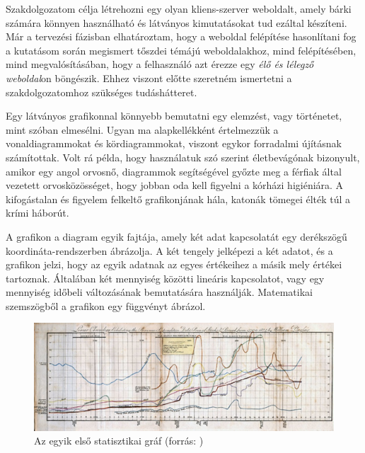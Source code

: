 
Szakdolgozatom célja létrehozni egy olyan kliens-szerver weboldalt, amely bárki számára könnyen használható és látványos kimutatásokat tud ezáltal készíteni. Már a tervezési fázisban elhatároztam, hogy a weboldal felépítése hasonlítani fog a kutatásom során megismert tőszdei témájú weboldalakhoz, mind felépítésében, mind megvalósításában, hogy a felhasználó azt érezze egy\textit{ élő és lélegző weboldal}on böngészik. Ehhez viszont előtte szeretném ismertetni a szakdolgozatomhoz szükséges tudáshátteret.


Egy látványos grafikonnal könnyebb bemutatni egy elemzést, vagy történetet, mint szóban elmesélni. Ugyan ma alapkellékként értelmezzük a vonaldiagrammokat és kördiagrammokat, viszont egykor forradalmi újításnak számítottak. Volt rá példa, hogy használatuk szó szerint életbevágónak bizonyult, amikor egy angol orvosnő, diagrammok segítségével győzte meg a férfiak által vezetett orvosközösséget, hogy jobban oda kell figyelni a kórházi higiéniára. A kifogástalan és figyelem felkeltő grafikonjának hála, katonák tömegei élték túl a krími háborút.  

	A grafikon a diagram egyik fajtája, amely két adat kapcsolatát egy derékszögű koordináta-rendszerben ábrázolja. A két tengely jelképezi a két adatot, és a grafikon jelzi, hogy az egyik adatnak az egyes értékeihez a másik mely értékei tartoznak. Általában két mennyiség közötti lineáris kapcsolatot, vagy egy mennyiség időbeli változásának bemutatására használják. Matematikai szemszögből a grafikon egy függvényt ábrázol. 

\begin{figure}[h]
\centering
\includegraphics[scale=1]{images/historyOfGraphs}
\caption{Az egyik első statisztikai gráf (forrás: \cite{oldGraph})}
\end{figure}


